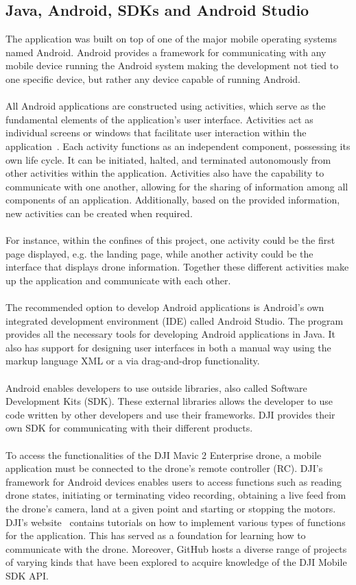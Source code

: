 \subsection{Java, Android, SDKs and Android Studio} \label{Java, Android....}
The application was built on top of one of the major mobile operating systems named Android. Android provides a framework for communicating with any mobile device running the Android system making the development not tied to one specific device, but rather any device capable of running Android. 
\\ \\
All Android applications are constructed using activities, which serve as the fundamental elements of the application's user interface. Activities act as individual screens or windows that facilitate user interaction within the application~\cite{Android}. Each activity functions as an independent component, possessing its own life cycle. It can be initiated, halted, and terminated autonomously from other activities within the application. Activities also have the capability to communicate with one another, allowing for the sharing of information among all components of an application. Additionally, based on the provided information, new activities can be created when required.
\\ \\
For instance, within the confines of this project, one activity could be the first page displayed, e.g. the landing page, while another activity could be the interface that displays drone information. Together these different activities make up the application and communicate with each other.
\\ \\
The recommended option to develop Android applications is Android's own integrated development environment (IDE) called Android Studio. The program provides all the necessary tools for developing Android applications in Java. It also has support for designing user interfaces in both a manual way using the markup language XML or a via drag-and-drop functionality.
\\ \\
Android enables developers to use outside libraries, also called Software Development Kits (SDK). These external libraries allows the developer to use code written by other developers and use their frameworks. DJI provides their own SDK for communicating with their different products.
\\ \\
To access the functionalities of the DJI Mavic 2 Enterprise drone, a mobile application must be connected to the drone's remote controller (RC). DJI's framework for Android devices enables users to access functions such as reading drone states, initiating or terminating video recording, obtaining a live feed from the drone's camera, land at a given point and starting or stopping the motors. DJI's website~\cite{githubmobilesdk} contains tutorials on how to implement various types of functions for the application. This has served as a foundation for learning how to communicate with the drone. Moreover, GitHub hosts a diverse range of projects of varying kinds that have been explored to acquire knowledge of the DJI Mobile SDK API.


